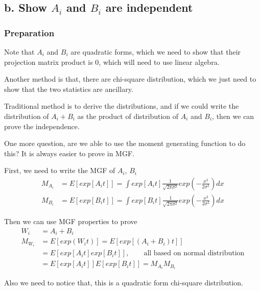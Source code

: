 \subsection{b. Show $A_i$ and $B_i$ are independent}

\subsubsection{Preparation}
Note that $A_i$ and $B_i$ are quadratic forms, which we need to show that their projection matrix product is 0, which will need to use linear algebra.

Another method is that, there are chi-square distribution, which we just need to show that the two statistics are ancillary.

Traditional method is to derive the distributions, and if we could write the distribution of $A_i + B_i$ as the product of distribution of $A_i$ and $B_i$, then we can prove the independence. 

One more question, are we able to use the moment generating function to do this? It is always easier to prove in MGF.

First, we need to write the MGF of $A_i$, $B_i$
\begin{align*}
	M_{A_i} & =E[exp[A_i t]] = \int exp[A_i t] \frac{1}{\sqrt{2 \pi \sigma^2}} exp(-\frac{x^2}{2 \sigma^2}) dx\\
	M_{B_i} & =E[exp[B_i t]] = \int exp[B_i t] \frac{1}{\sqrt{2 \pi \sigma^2}} exp(-\frac{x^2}{2 \sigma^2}) dx
\end{align*} 

Then we can use MGF properties to prove
\begin{align*}
	W_i & = A_i + B_i\\
	M_{W_i} &= E[exp(W_i t)] = E[exp[(A_i + B_i) t]] \\
	&= E[exp[A_i t] exp[B_i t]], \qquad \text{all based on normal distribution} \\
	&= E[exp[A_i t]] E[exp[B_i t]] = M_{A_i} M_{B_i}
\end{align*} 

Also we need to notice that, this is a quadratic form chi-square distribution.

